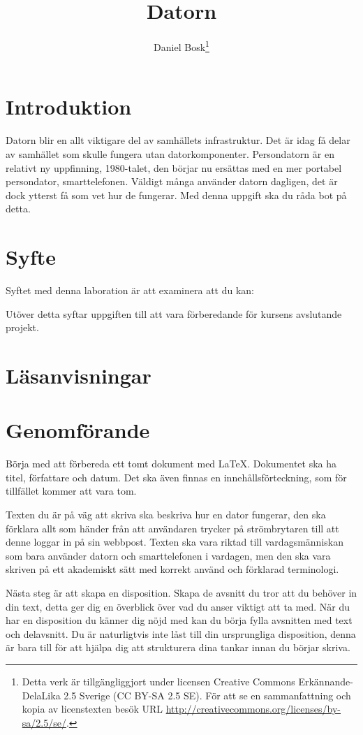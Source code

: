 \documentclass[a4paper]{miunasgn}
\title{Datorn}
\author{Daniel Bosk\footnote{%
	Detta verk är tillgängliggjort under licensen Creative Commons 
	Erkännande-DelaLika 2.5 Sverige (CC BY-SA 2.5 SE).
	För att se en sammanfattning och kopia av licenstexten besök URL 
	\url{http://creativecommons.org/licenses/by-sa/2.5/se/}.
}}
\date{\svnId}
\begin{document}
\maketitle
\thispagestyle{foot}
\tableofcontents


\section{Introduktion}
\label{sec:Introduktion}
Datorn blir en allt viktigare del av samhällets infrastruktur.
Det är idag få delar av samhället som skulle fungera utan datorkomponenter.
Persondatorn är en relativt ny uppfinning, 1980-talet, den börjar nu ersättas 
med en mer portabel persondator, smarttelefonen.
Väldigt många använder datorn dagligen, det är dock ytterst få som vet hur de 
fungerar.
Med denna uppgift ska du råda bot på detta.


\section{Syfte}
\label{sec:Syfte}
\noindent
Syftet med denna laboration är att examinera att du kan:
\begin{itemize}
  
\end{itemize}
Utöver detta syftar uppgiften till att vara förberedande för kursens avslutande 
projekt.


\section{Läsanvisningar}
\label{sec:Lasanvisningar}



\section{Genomförande}
\label{sec:Genomforande}
Börja med att förbereda ett tomt dokument med LaTeX.
Dokumentet ska ha titel, författare och datum.
Det ska även finnas en innehållsförteckning, som för tillfället kommer att vara 
tom.

Texten du är på väg att skriva ska beskriva hur en dator fungerar, den ska 
förklara allt som händer från att användaren trycker på strömbrytaren till att 
denne loggar in på sin webbpost.
Texten ska vara riktad till vardagsmänniskan som bara använder datorn och 
smarttelefonen i vardagen, men den ska vara skriven på ett akademiskt sätt med 
korrekt använd och förklarad terminologi.

Nästa steg är att skapa en disposition.
Skapa de avsnitt du tror att du behöver in din text, detta ger dig en överblick 
över vad du anser viktigt att ta med.
När du har en disposition du känner dig nöjd med kan du börja fylla avsnitten 
med text och delavsnitt.
Du är naturligtvis inte låst till din ursprungliga disposition, denna är bara 
till för att hjälpa dig att strukturera dina tankar innan du börjar skriva.
\end{document}
